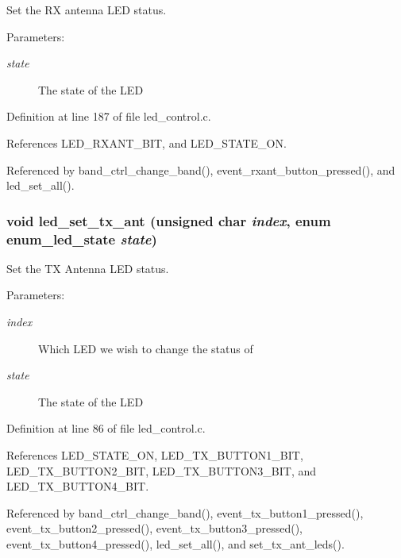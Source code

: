 Set the RX antenna LED status. 

\begin{Desc}
\item[Parameters:]
\begin{description}
\item[{\em state}]The state of the LED \end{description}
\end{Desc}


Definition at line 187 of file led\_\-control.c.

References LED\_\-RXANT\_\-BIT, and LED\_\-STATE\_\-ON.

Referenced by band\_\-ctrl\_\-change\_\-band(), event\_\-rxant\_\-button\_\-pressed(), and led\_\-set\_\-all().
\subsubsection[{led\_\-set\_\-tx\_\-ant}]{\setlength{\rightskip}{0pt plus 5cm}void led\_\-set\_\-tx\_\-ant (unsigned char {\em index}, \/  enum {\bf enum\_\-led\_\-state} {\em state})}\label{led__control_8h_66d6c83ed387c751253fe06a14ee842f}


Set the TX Antenna LED status. 

\begin{Desc}
\item[Parameters:]
\begin{description}
\item[{\em index}]Which LED we wish to change the status of \item[{\em state}]The state of the LED \end{description}
\end{Desc}


Definition at line 86 of file led\_\-control.c.

References LED\_\-STATE\_\-ON, LED\_\-TX\_\-BUTTON1\_\-BIT, LED\_\-TX\_\-BUTTON2\_\-BIT, LED\_\-TX\_\-BUTTON3\_\-BIT, and LED\_\-TX\_\-BUTTON4\_\-BIT.

Referenced by band\_\-ctrl\_\-change\_\-band(), event\_\-tx\_\-button1\_\-pressed(), event\_\-tx\_\-button2\_\-pressed(), event\_\-tx\_\-button3\_\-pressed(), event\_\-tx\_\-button4\_\-pressed(), led\_\-set\_\-all(), and set\_\-tx\_\-ant\_\-leds().
